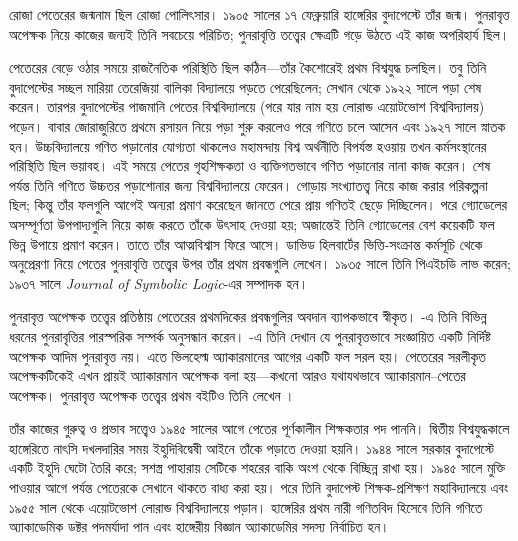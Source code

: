 \documentclass[../../../include/open-logic-section]{subfiles}
\begin{document}



রোজা পেতেরের জন্মনাম ছিল রোজা পোলিৎসার। ১৯০৫
সালের ১৭ ফেব্রুয়ারি হাঙ্গেরির বুদাপেস্টে তাঁর জন্ম।
পুনরাবৃত্ত অপেক্ষক নিয়ে কাজের জন্যই তিনি সবচেয়ে
পরিচিত; পুনরাবৃত্তি তত্ত্বের ক্ষেত্রটি গড়ে উঠতে এই
কাজ অপরিহার্য ছিল।

পেতেরের বেড়ে ওঠার সময়ে রাজনৈতিক পরিস্থিতি ছিল
কঠিন—তাঁর কৈশোরেই প্রথম বিশ্বযুদ্ধ চলছিল। তবু
তিনি বুদাপেস্টের সচ্ছল মারিয়া তেরেজিয়া বালিকা
বিদ্যালয়ে পড়তে পেরেছিলেন; সেখান থেকে ১৯২২
সালে পড়া শেষ করেন। তারপর বুদাপেস্টের পাজমানি
পেতের বিশ্ববিদ্যালয়ে (পরে যার নাম হয় লোরান্ড
এয়োটভোশ বিশ্ববিদ্যালয়) পড়েন। বাবার জোরাজুরিতে
প্রথমে রসায়ন নিয়ে পড়া শুরু করলেও পরে গণিতে
চলে আসেন এবং ১৯২৭ সালে স্নাতক হন। উচ্চবিদ্যালয়ে
গণিত পড়ানোর যোগ্যতা থাকলেও মহামন্দায় বিশ্ব
অর্থনীতি বিপর্যস্ত হওয়ায় তখন কর্মসংস্থানের
পরিস্থিতি ছিল ভয়াবহ। এই সময়ে পেতের গৃহশিক্ষকতা
ও ব্যক্তিগতভাবে গণিত পড়ানোর নানা কাজ করেন।
শেষ পর্যন্ত তিনি গণিতে উচ্চতর পড়াশোনার জন্য
বিশ্ববিদ্যালয়ে ফেরেন। গোড়ায় সংখ্যাতত্ত্ব নিয়ে
কাজ করার পরিকল্পনা ছিল; কিন্তু তাঁর ফলগুলি
আগেই অন্যরা প্রমাণ করেছেন জানতে পেরে প্রায়
গণিতই ছেড়ে দিচ্ছিলেন। পরে গ্যোডেলের অসম্পূর্ণতা
উপপাদ্যগুলি নিয়ে কাজ করতে তাঁকে উৎসাহ দেওয়া
হয়; অজান্তেই তিনি গ্যোডেলের বেশ কয়েকটি ফল
ভিন্ন উপায়ে প্রমাণ করেন। তাতে তাঁর আত্মবিশ্বাস
ফিরে আসে। ডাভিড হিলবার্টের ভিত্তি-সংক্রান্ত
কর্মসূচি থেকে অনুপ্রেরণা নিয়ে পেতের পুনরাবৃত্তি
তত্ত্বের উপর তাঁর প্রথম প্রবন্ধগুলি লেখেন। ১৯৩৫
সালে তিনি পিএইচডি লাভ করেন; ১৯৩৭ সালে
\emph{Journal of Symbolic Logic}-এর সম্পাদক হন।

পুনরাবৃত্ত অপেক্ষক তত্ত্বের প্রতিষ্ঠায় পেতেরের
প্রথমদিকের প্রবন্ধগুলির অবদান ব্যাপকভাবে স্বীকৃত।
\cite{Peter1935a}-এ তিনি বিভিন্ন ধরনের
পুনরাবৃত্তির পারস্পরিক সম্পর্ক অনুসন্ধান করেন।
\cite{Peter1935b}-এ তিনি দেখান যে পুনরাবৃত্তভাবে
সংজ্ঞায়িত একটি নির্দিষ্ট অপেক্ষক আদিম পুনরাবৃত্ত
নয়। এতে ভিলহেল্ম অ্যাকারমানের আগের একটি
ফল সরল হয়। পেতেরের সরলীকৃত অপেক্ষকটিকেই
এখন প্রায়ই অ্যাকারমান অপেক্ষক বলা হয়—কখনো
আরও যথাযথভাবে অ্যাকারমান--পেতের অপেক্ষক।
পুনরাবৃত্ত অপেক্ষক তত্ত্বের প্রথম বইটিও তিনি লেখেন
\citep{Peter1951}।

তাঁর কাজের গুরুত্ব ও প্রভাব সত্ত্বেও ১৯৪৫ সালের
আগে পেতের পূর্ণকালীন শিক্ষকতার পদ পাননি।
দ্বিতীয় বিশ্বযুদ্ধকালে হাঙ্গেরিতে নাৎসি দখলদারির
সময় ইহুদিবিদ্বেষী আইনে তাঁকে পড়াতে দেওয়া হয়নি।
১৯৪৪ সালে সরকার বুদাপেস্টে একটি ইহুদি ঘেটো
তৈরি করে; সশস্ত্র পাহারায় সেটিকে শহরের বাকি
অংশ থেকে বিচ্ছিন্ন রাখা হয়। ১৯৪৫ সালে মুক্তি
পাওয়ার আগে পর্যন্ত পেতেরকে সেখানে থাকতে
বাধ্য করা হয়। পরে তিনি বুদাপেস্ট শিক্ষক-প্রশিক্ষণ
মহাবিদ্যালয়ে এবং ১৯৫৫ সাল থেকে এয়োটভোশ
লোরান্ড বিশ্ববিদ্যালয়ে পড়ান। হাঙ্গেরির প্রথম
নারী গণিতবিদ হিসেবে তিনি গণিতে অ্যাকাডেমিক
ডক্টর পদমর্যাদা পান এবং হাঙ্গেরীয় বিজ্ঞান
অ্যাকাডেমির সদস্য নির্বাচিত হন।
\end{document}
